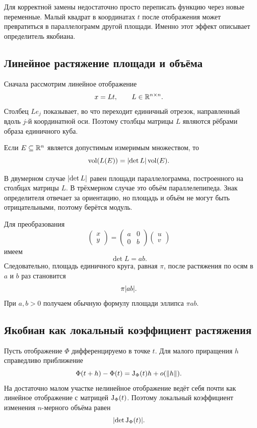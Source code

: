 Для корректной замены недостаточно просто переписать функцию через новые переменные. Малый квадрат в координатах $t$ после отображения может превратиться в параллелограмм другой площади. Именно этот эффект описывает определитель якобиана.

\subsection{Линейное растяжение площади и объёма}

Сначала рассмотрим линейное отображение
\[
x=Lt,
\qquad
L\in\mathbb{R}^{n\times n}.
\]
Столбец $Le_j$ показывает, во что переходит единичный отрезок, направленный вдоль $j$-й координатной оси. Поэтому столбцы матрицы $L$ являются рёбрами образа единичного куба.

\begin{theorem}
Если $E\subseteq\mathbb{R}^n$ является допустимым измеримым множеством, то
\[
\operatorname{vol}(L(E))
=
\lvert\det L\rvert\operatorname{vol}(E).
\]
\end{theorem}

В двумерном случае $\lvert\det L\rvert$ равен площади параллелограмма, построенного на столбцах матрицы $L$. В трёхмерном случае это объём параллелепипеда. Знак определителя отвечает за ориентацию, но площадь и объём не могут быть отрицательными, поэтому берётся модуль.

\begin{example}
Для преобразования
\[
\begin{pmatrix}x\\y\end{pmatrix}
=
\begin{pmatrix}
 a&0\\
 0&b
\end{pmatrix}
\begin{pmatrix}u\\v\end{pmatrix}
\]
имеем
\[
\det L=ab.
\]
Следовательно, площадь единичного круга, равная $\pi$, после растяжения по осям в $a$ и $b$ раз становится
\[
\pi\lvert ab\rvert.
\]
При $a,b>0$ получаем обычную формулу площади эллипса $\pi ab$.
\end{example}

\subsection{Якобиан как локальный коэффициент растяжения}

Пусть отображение $\Phi$ дифференцируемо в точке $t$. Для малого приращения $h$ справедливо приближение
\[
\Phi(t+h)-\Phi(t)
=
\mathrm{J}_{\Phi}(t)h+o(\lVert h\rVert).
\]
На достаточно малом участке нелинейное отображение ведёт себя почти как линейное отображение с матрицей $\mathrm{J}_{\Phi}(t)$. Поэтому локальный коэффициент изменения $n$-мерного объёма равен
\[
\lvert\det\mathrm{J}_{\Phi}(t)\rvert.
\]

